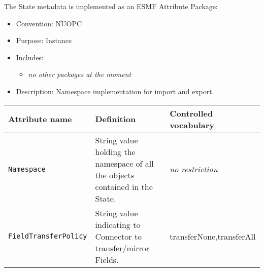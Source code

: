 \label{StateMeta}
The State metadata is implemented as an ESMF Attribute Package:

\begin{itemize}
    \item Convention: NUOPC
    \item Purpose: Instance
    \item Includes:
    \begin{itemize}
        \item {\em no other packages at the moment}
    \end{itemize} 
    \item Description: Namespace implementation for import and export. 
\end{itemize}

\begin{longtable}{|p{}|p{}|p{}|}
     \hline\hline
     {\bf Attribute name} & {\bf Definition} & {\bf Controlled vocabulary}\\
     \hline\hline
     {\tt Namespace}            & String value holding the namespace of all the objects contained in the State.& {\em no restriction}\\ \hline
     {\tt FieldTransferPolicy}  & String value indicating to Connector to transfer/mirror Fields. & transferNone,\newline transferAll\\ \hline
     \hline
\end{longtable}
